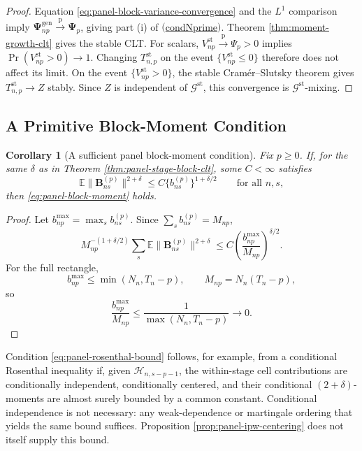 \documentclass[11pt]{article}
\renewcommand\vec[1]{\boldsymbol{#1}}
\newcommand\mat[1]{\mathbf{#1}}
\newcommand{\E}{\mathbb{E}}
\newcommand{\G}{\mathcal{G}}
\newcommand{\Hcal}{\mathcal{H}}
\newcommand{\refitem}[1]{$\mathrm{(}$\hyperlink{cond:#1}{\csname cond#1\endcsname}$\mathrm{)}$}
\newcommand{\pconverge}{\overset{\mathrm{p}}{\to}}
\newtheorem{corollary}{Corollary}
\theoremstyle{definition}
\begin{document}
\begin{proof}
Equation \eqref{eq:panel-block-variance-convergence} and the \(L^1\) comparison imply \(\mat{\Psi}_{np}^{\mathrm{gen}}\pconverge\mat\Psi_p\), giving part (i) of \refitem{Nprime}.
Theorem \ref{thm:moment-growth-clt} gives the stable CLT.
For scalars, \(V_{np}^{\mathrm{st}}\pconverge\Psi_p>0\) implies \(\Pr(V_{np}^{\mathrm{st}}>0)\to1\).
Changing \(T_{n,p}^{\mathrm{st}}\) on the event \(\{V_{np}^{\mathrm{st}}\leq0\}\) therefore does not affect its limit.
On the event \(\{V_{np}^{\mathrm{st}}>0\}\), the stable Cram\'er--Slutsky theorem gives \(T_{n,p}^{\mathrm{st}}\to Z\) stably.
Since \(Z\) is independent of \(\G^{\mathrm{st}}\), this convergence is \(\G^{\mathrm{st}}\)-mixing.
\end{proof}

\subsection{A Primitive Block-Moment Condition}

\begin{corollary}[A sufficient panel block-moment condition]
\label{cor:panel-block-moment}
Fix \(p\geq0\).
If, for the same \(\delta\) as in Theorem \ref{thm:panel-stage-block-clt}, some \(C<\infty\) satisfies
\begin{equation}\label{eq:panel-rosenthal-bound}
\E\|\vec B^{(p)}_{ns}\|^{2+\delta}
\leq C\{b^{(p)}_{ns}\}^{1+\delta/2}
\qquad\text{for all }n,s,
\end{equation}
then \eqref{eq:panel-block-moment} holds.
\end{corollary}

\begin{proof}
Let \(b_{np}^{\max}=\max_s b^{(p)}_{ns}\).
Since \(\sum_s b^{(p)}_{ns}=M_{np}\),
\[
M_{np}^{-(1+\delta/2)}
\sum_s\E\|\vec B^{(p)}_{ns}\|^{2+\delta}
\leq
C\left(\frac{b_{np}^{\max}}{M_{np}}\right)^{\delta/2}.
\]
For the full rectangle,
\[
b_{np}^{\max}\leq\min(N_n,T_n-p),
\qquad M_{np}=N_n(T_n-p),
\]
so
\[
\frac{b_{np}^{\max}}{M_{np}}
\leq\frac1{\max(N_n,T_n-p)}\longrightarrow0.
\]
\end{proof}

Condition \eqref{eq:panel-rosenthal-bound} follows, for example, from a conditional Rosenthal inequality if, given \(\Hcal_{n,s-p-1}\), the within-stage cell contributions are conditionally independent, conditionally centered, and their conditional \((2+\delta)\)-moments are almost surely bounded by a common constant.
Conditional independence is not necessary: any weak-dependence or martingale ordering that yields the same bound suffices.
Proposition \ref{prop:panel-ipw-centering} does not itself supply this bound.
\end{document}
